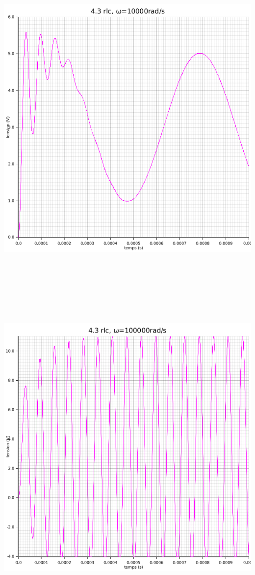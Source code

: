 \documentclass{article}
\begin{document}
{\begin{center}
      \includegraphics[height=45em]{images/rlcsinus10e3.png}
    \end{center}
    \begin{center}
      \includegraphics[height=45em]{images/rlcsinus100e3.png}
    \end{center}
}
\end{document}
